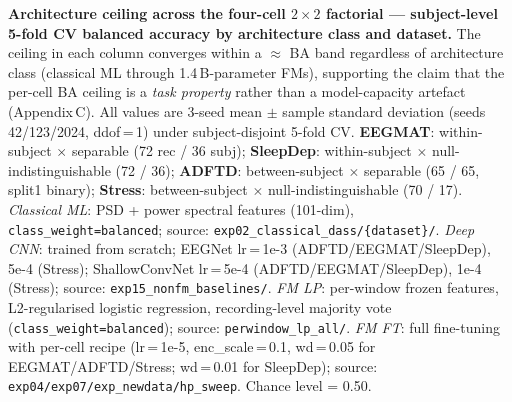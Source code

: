 \documentclass[10pt]{article}
\begin{document}
\begin{table}[htbp]
\centering
\footnotesize
\caption{\textbf{Architecture ceiling across the four-cell $2\times2$ factorial ---
subject-level 5-fold CV balanced accuracy by architecture class and dataset.}
The ceiling in each column converges within a $\approx$ BA band regardless of architecture class (classical ML through 1.4\,B-parameter FMs), supporting the claim that the per-cell BA ceiling is a \emph{task property} rather than a model-capacity artefact (Appendix\,C).
All values are 3-seed mean $\pm$ sample standard deviation (seeds 42/123/2024, ddof\,=\,1) under subject-disjoint 5-fold CV.
\textbf{EEGMAT}: within-subject $\times$ separable (72 rec / 36 subj);
\textbf{SleepDep}: within-subject $\times$ null-indistinguishable (72 / 36);
\textbf{ADFTD}: between-subject $\times$ separable (65 / 65, split1 binary);
\textbf{Stress}: between-subject $\times$ null-indistinguishable (70 / 17).
\emph{Classical ML}: PSD + power spectral features (101-dim), \texttt{class\_weight=balanced}; source: \texttt{exp02\_classical\_dass/\{dataset\}/}.
\emph{Deep CNN}: trained from scratch; EEGNet lr\,=\,1e-3 (ADFTD/EEGMAT/SleepDep), 5e-4 (Stress); ShallowConvNet lr\,=\,5e-4 (ADFTD/EEGMAT/SleepDep), 1e-4 (Stress); source: \texttt{exp15\_nonfm\_baselines/}.
\emph{FM LP}: per-window frozen features, L2-regularised logistic regression, recording-level majority vote (\texttt{class\_weight=balanced}); source: \texttt{perwindow\_lp\_all/}.
\emph{FM FT}: full fine-tuning with per-cell recipe (lr\,=\,1e-5, enc\_scale\,=\,0.1, wd\,=\,0.05 for EEGMAT/ADFTD/Stress; wd\,=\,0.01 for SleepDep); source: \texttt{exp04/exp07/exp\_newdata/hp\_sweep}.
Chance level = 0.50.}
\label{tab:architecture_ceiling}


\end{table}
\end{document}
